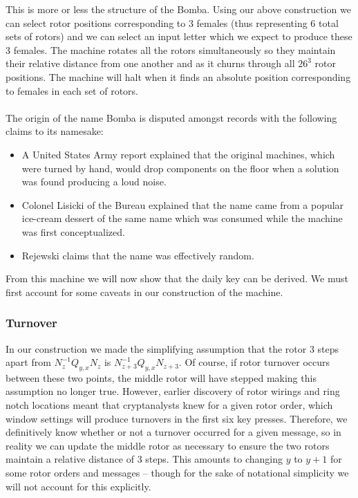 \noindent This is more or less the structure of the Bomba. Using our
above construction we can select rotor positions corresponding to 3
females (thus representing 6 total sets of rotors) and we can select
an input letter which we expect to produce these 3 females. The
machine rotates all the rotors simultaneously so they maintain their
relative distance from one another and as it churns through all
$26^3$ rotor positions. The machine will halt when it finds an
absolute position corresponding to females in each set of rotors.
\\\\The
origin of the name Bomba is disputed amongst records with the
following claims to its namesake:
\begin{itemize}
  \item A United States Army report explained that the original
    machines, which were turned by hand, would drop components on the
    floor when a solution was found producing a loud noise.
  \item Colonel Lisicki of the Bureau explained that
    the name came from a popular ice-cream dessert of the same name
    which was consumed while the machine was first conceptualized.
  \item Rejewski claims that the name was effectively random.
\end{itemize}
From this machine we will now show that the daily key can be derived.
We must first account for some caveats in our construction of the machine.

\subsubsection{Turnover}
In our construction we made the simplifying assumption that the rotor
3 steps apart from $N_{z}^{-1}Q_{y,x}N_{z}$ is
$N_{z+3}^{-1}Q_{y,x}N_{z+3}$. Of course, if rotor turnover occurs
between these two points, the middle rotor will have stepped making
this assumption no longer true. However, earlier discovery of rotor
wirings and ring notch locations meant that cryptanalysts knew for a
given rotor order, which window settings will produce turnovers in
the first six key presses. Therefore, we definitively know whether or
not a turnover occurred for a given message, so in reality we can
update the middle rotor as necessary to ensure the two rotors
maintain a relative distance of 3 steps. This amounts to changing $y$
to $y+1$ for some rotor orders and messages -- though for the sake of
notational simplicity we will not account for this explicitly.
